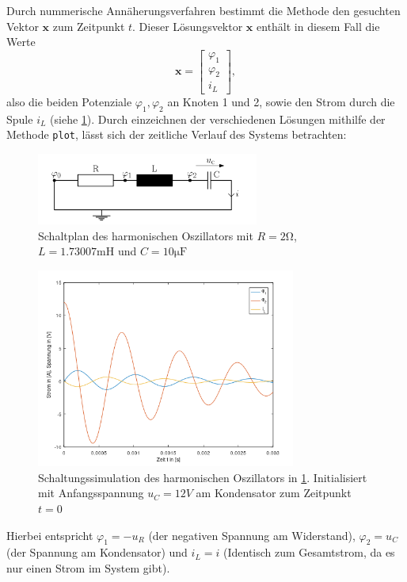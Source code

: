 	Durch nummerische Annäherungsverfahren bestimmt die Methode den gesuchten Vektor $\mathbf{x}$ zum Zeitpunkt $t$. Dieser Lösungsvektor $\mathbf{x}$ enthält in diesem Fall die Werte
	\begin{equation}
	\mathbf{x} =
	\begin{bmatrix}
		\varphi_1\\
		\varphi_2\\
		i_L
	\end{bmatrix},
	\end{equation}
	also die beiden Potenziale $\varphi_1, \varphi_2$ an Knoten 1 und 2, sowie den Strom durch die Spule $i_L$ (siehe \ref{schaltplan}).
	Durch einzeichnen der verschiedenen Lösungen mithilfe der Methode \texttt{plot}, lässt sich der zeitliche Verlauf des Systems betrachten:
	
	\begin{figure}[h]
		\centering
		\includegraphics[width=0.65\textwidth]{data/schaltplan}
		\caption{\centering Schaltplan des harmonischen Oszillators mit $R=2\si{\ohm}$, $L=1.73007\si{\milli\henry}$ und $C=10\si{\micro\farad}$}
		\label{schaltplan}
	\end{figure}
	
	\begin{figure}[t]
		\centering
		\includegraphics[width=0.76\textwidth]{data/plot}
		\caption{Schaltungssimulation des harmonischen Oszillators in \ref{schaltplan}. Initialisiert mit Anfangsspannung $u_C = 12V$ am Kondensator zum Zeitpunkt $t = 0$ }
		\label{plot}
	\end{figure}
\newpage
Hierbei entspricht $\varphi_1 = -u_R$ (der negativen Spannung am Widerstand), $\varphi_2 = u_C$ (der Spannung am Kondensator) und $i_L = i$ (Identisch zum Gesamtstrom, da es nur einen Strom im System gibt).

